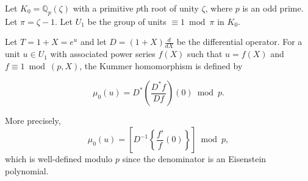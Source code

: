 Let $K_0 = \mathbb{Q}_p(\zeta)$ with a primitive $p$th root of unity $\zeta$, where $p$ is an odd prime. Let $\pi = \zeta - 1$. Let $U_1$ be the group of units $\equiv 1 \bmod \pi$ in $K_0$.

Let $T = 1 + X = e^u$ and let $D = (1 + X)\frac{d}{dX}$ be the differential operator. For a unit $u \in U_1$ with associated power series $f(X)$ such that $u = f(X)$ and $f \equiv 1 \bmod (p, X)$, the Kummer homomorphism is defined by

$$\mu_0(u) = D^*\left(\frac{D^* f}{D f}\right)(0) \bmod p.$$

More precisely,
$$\mu_0(u) = \left[D^{-1}\left\{\frac{f'}{f}(0)\right\}\right] \bmod p,$$
which is well-defined modulo $p$ since the denominator is an Eisenstein polynomial.
